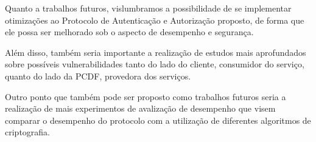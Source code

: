 Quanto a trabalhos futuros, vislumbramos a possibilidade de se implementar otimizações ao Protocolo de Autenticação e Autorização proposto, de forma que ele possa ser melhorado sob o aspecto de desempenho e segurança. 

Além disso, também seria importante a realização de estudos mais aprofundados sobre possíveis vulnerabilidades tanto do lado do cliente, consumidor do serviço,  quanto do lado da PCDF, provedora dos serviços. 

Outro ponto que também pode ser proposto como trabalhos futuros seria a realização de mais experimentos de avalização de desempenho que visem comparar o desempenho do protocolo com a utilização  de diferentes algoritmos de criptografia.




